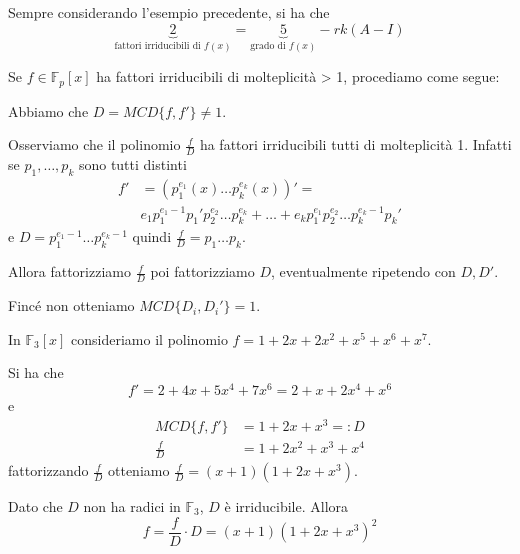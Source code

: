 \documentclass[../main.tex]{subfiles}
\begin{document}
\begin{example}
    Sempre considerando l'esempio precedente, si ha che
    \begin{equation*}
        \underbrace{2}_{\text{fattori irriducibili di $f(x)$}} = \underbrace{5}_{\text{grado di $f(x)$}} - rk(A - I)
    \end{equation*}
\end{example}

Se $f \in \mathbb{F}_p[x]$ ha fattori irriducibili di molteplicità > 1, procediamo come segue:

Abbiamo che $D = MCD\{f, f'\} \neq 1$.

Osserviamo che il polinomio $\frac{f}{D}$ ha fattori irriducibili tutti di molteplicità 1. Infatti se $p_1, \ldots , p_k$ sono tutti distinti
\begin{align*}
    f' & = (p_1^{e_1}(x) \ldots p_k^{e_k}(x))' =                                                                     \\
       & e_1 p_1^{e_1 - 1} p_1'p_2^{e_2} \ldots p_k^{e_k} + \ldots + e_k p_1^{e_1}p_2^{e_2} \ldots p_k^{e_k - 1}p_k'
\end{align*}
e $D = p_1^{e_1 - 1} \ldots p_k^{e_k - 1}$ quindi $\frac{f}{D} = p_1 \ldots p_k$.

Allora fattorizziamo $\frac{f}{D}$ poi fattorizziamo $D$, eventualmente ripetendo con $D, D'$.

Fincé non otteniamo $MCD\{ D_i, D_i'\} = 1$.

\begin{example}
    In $\mathbb{F}_3[x]$ consideriamo il polinomio $f = 1 + 2x + 2x^2 + x^5 + x^6 + x^7$.

    Si ha che
    \begin{equation*}
        f' = 2 + 4x + 5x^4 + 7x^6 = 2 + x + 2x^4 + x^6
    \end{equation*}
    e
    \begin{align*}
        MCD\{f, f'\} & = 1 + 2x + x^3 =: D    \\
        \frac{f}{D}  & = 1 + 2x^2 + x^3 + x^4
    \end{align*}
    fattorizzando $\frac{f}{D}$ otteniamo $\frac{f}{D} = (x + 1)(1 + 2x+x^3)$.

    Dato che $D$ non ha radici in $\mathbb{F}_3$, $D$ è irriducibile. Allora
    \begin{equation*}
        f = \frac{f}{D} \cdot D = (x + 1)(1 + 2x + x^3)^2
    \end{equation*}
\end{example}
\end{document}
